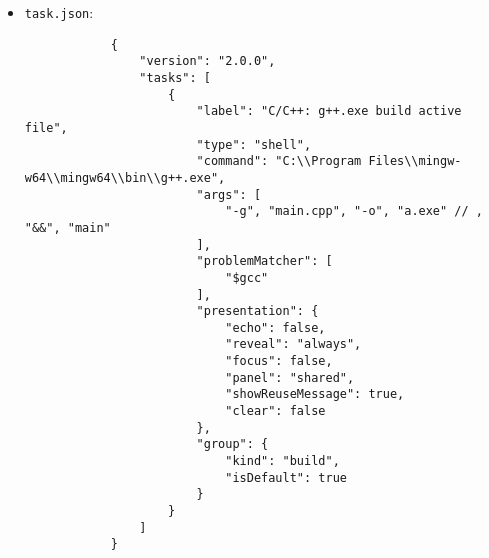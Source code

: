 \begin{itemize}
    \item \verb|task.json|:
        \begin{verbatim}
            {
                "version": "2.0.0",
                "tasks": [
                    {
                        "label": "C/C++: g++.exe build active file",
                        "type": "shell",
                        "command": "C:\\Program Files\\mingw-w64\\mingw64\\bin\\g++.exe",
                        "args": [
                            "-g", "main.cpp", "-o", "a.exe" // , "&&", "main"  
                        ],
                        "problemMatcher": [
                            "$gcc"
                        ],
                        "presentation": {
                            "echo": false,
                            "reveal": "always",
                            "focus": false,
                            "panel": "shared",
                            "showReuseMessage": true,
                            "clear": false
                        },
                        "group": {
                            "kind": "build",
                            "isDefault": true
                        }
                    }
                ]
            }
        \end{verbatim}
\end{itemize}
